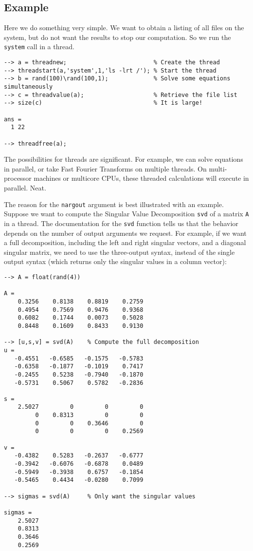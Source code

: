 \subsection{Example}

Here we do something very simple.  We want to obtain a listing of
all files on the system, but do not want the results to stop our
computation.  So we run the \verb|system| call in a thread.
\begin{verbatim}
--> a = threadnew;                         % Create the thread
--> threadstart(a,'system',1,'ls -lrt /'); % Start the thread
--> b = rand(100)\rand(100,1);             % Solve some equations simultaneously
--> c = threadvalue(a);                    % Retrieve the file list
--> size(c)                                % It is large!

ans = 
  1 22 

--> threadfree(a);
\end{verbatim}
The possibilities for threads are significant.  For example,
we can solve equations in parallel, or take Fast Fourier Transforms
on multiple threads.  On multi-processor machines or multicore CPUs,
these threaded calculations will execute in parallel.  Neat.

The reason for the  \verb|nargout| argument is best illustrated with
an example.  Suppose we want to compute the Singular Value 
Decomposition \verb|svd| of a matrix \verb|A| in a thread.  
The documentation for the \verb|svd| function tells us that
the behavior depends on the number of output arguments we request.
For example, if we want a full decomposition, including the left 
and right singular vectors, and a diagonal singular matrix, we
need to use the three-output syntax, instead of the single output
syntax (which returns only the singular values in a column vector):
\begin{verbatim}
--> A = float(rand(4))

A = 
    0.3256    0.8138    0.8819    0.2759 
    0.4954    0.7569    0.9476    0.9368 
    0.6082    0.1744    0.0073    0.5028 
    0.8448    0.1609    0.8433    0.9130 

--> [u,s,v] = svd(A)    % Compute the full decomposition
u = 
   -0.4551   -0.6585   -0.1575   -0.5783 
   -0.6358   -0.1877   -0.1019    0.7417 
   -0.2455    0.5238   -0.7940   -0.1870 
   -0.5731    0.5067    0.5782   -0.2836 

s = 
    2.5027         0         0         0 
         0    0.8313         0         0 
         0         0    0.3646         0 
         0         0         0    0.2569 

v = 
   -0.4382    0.5283   -0.2637   -0.6777 
   -0.3942   -0.6076   -0.6878    0.0489 
   -0.5949   -0.3938    0.6757   -0.1854 
   -0.5465    0.4434   -0.0280    0.7099 

--> sigmas = svd(A)     % Only want the singular values

sigmas = 
    2.5027 
    0.8313 
    0.3646 
    0.2569 
\end{verbatim}

